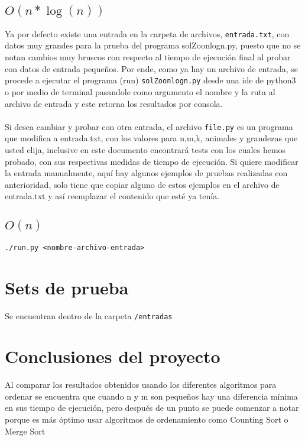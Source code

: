 \documentclass{article}
\begin{document}
		\subsection{$O(n*\log(n))$}		
		Ya por defecto existe una entrada en la carpeta de archivos, \texttt{entrada.txt}, con datos muy grandes para la prueba del programa solZoonlogn.py, puesto que no se notan cambios muy bruscos con respecto al tiempo de ejecución final al probar con datos de entrada pequeños. 
		Por ende, como ya hay un archivo de entrada, se procede a ejecutar el programa (run) \texttt{solZoonlogn.py} desde una ide de python3 o por medio de terminal pasandole como argumento el nombre y la ruta al archivo de entrada y este retorna los resultados por consola.\\\\
		Si desea cambiar y probar con otra entrada, el archivo \texttt{file.py} es un programa que modifica a entrada.txt, con los valores para n,m,k, animales y grandezas que usted elija, inclusive en este documento encontrará tests con los cuales hemos probado, con sus respectivas medidas de tiempo de ejecución. Si quiere modificar la entrada manualmente, aquí hay algunos ejemplos de pruebas realizadas con anterioridad, solo tiene que copiar alguno de estos ejemplos en el archivo de entrada.txt y así reemplazar el contenido que esté ya tenía.
		\subsection{$O(n)$}
			\texttt{./run.py <nombre-archivo-entrada>}
	\section{Sets de prueba}
		Se encuentran dentro de la carpeta \texttt{/entradas}
	\section{Conclusiones del proyecto}
Al comparar los resultados obtenidos usando los diferentes algoritmos para ordenar se encuentra que cuando n y m son pequeños hay una diferencia mínima en sus tiempo de ejecución, pero después de un punto se puede comenzar a notar porque es más óptimo usar algoritmos de ordenamiento como Counting Sort  o Merge Sort 
\end{document}
